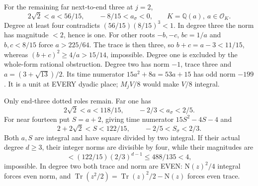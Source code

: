 \documentclass[11pt]{article}
\begin{document}
For the remaining far next-to-end three at \(j=2\),
\[
 2\sqrt2<a<56/15,\qquad
 -8/15<a_\sigma<0,\qquad K=\mathbb Q(a),\ a\in\mathcal O_K .
\]
Degree at least four contradicts
\((56/15)(8/15)^3<1\).
In degree three the norm has magnitude \(<2\), hence
is one.
For other roots \(-b,-c\), \(bc=1/a\) and
\(b,c<8/15\) force \(a>225/64\).
The trace is then three, so
\(b+c=a-3<11/15\), whereas
\((b+c)^2\ge4/a>15/14\), impossible.
Degree one is excluded by the whole-form rational obstruction.
Degree two has norm \(-1\), trace three and
\(a=(3+\sqrt{13})/2\).
Its time numerator \(15a^2+8a=53a+15\)
has odd norm \(-199\).
It is a unit at EVERY dyadic place;
\(M_jV/8\) would make \(V/8\) integral.

Only end-three dotted roles remain.
Far one has
\[
 2\sqrt2<a<118/15,\qquad -2/3<a_\sigma<2/5 .
\]
For near fourteen put \(S=a+2\), giving time numerator
\(15S^2-4S-4\) and
\[
 2+2\sqrt2<S<122/15,\qquad -2/5<S_\sigma<2/3 .
\]
Both \(a,S\) are integral and have square divided
by two integral.
If their actual degree \(d\ge3\), their integer norms
are divisible by four, while their magnitudes are
\[
                   <(122/15)(2/3)^{d-1}\le488/135<4,
\]
impossible.
In degree two both trace and norm are EVEN:
\(\mathrm N(z)^2/4\) integral forces even norm, and
\(\operatorname{Tr}(z^2/2)
 =\operatorname{Tr}(z)^2/2-\mathrm N(z)\)
forces even trace.
\end{document}
